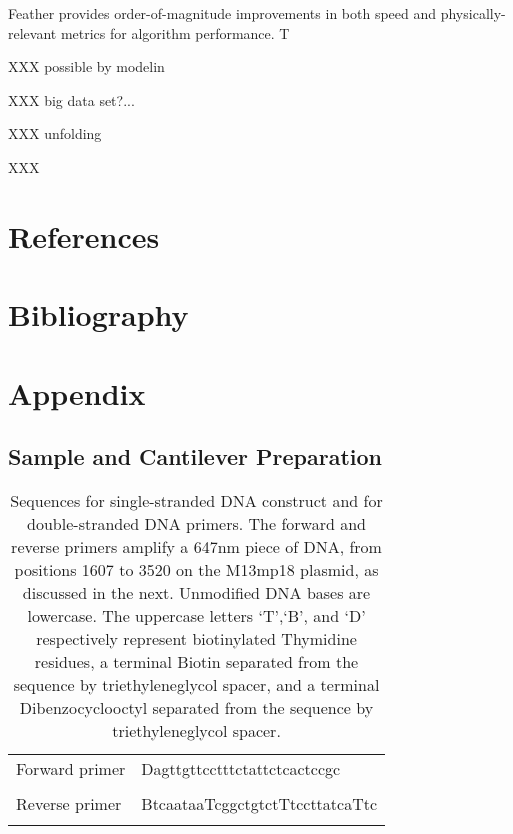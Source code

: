 \documentclass[%
  aip,12pt,tightenlines,
  amsthm,
 amsmath,amssymb
]{article}
\newcommand{\e}[0]{\\ \hline}
\newcommand{\tLabel}[1]{\label{table:#1}}
\newcommand{\sLabel}[1]{\label{section:#1}}
\newcommand{\firstp}[0]{}
\newcommand{\pl}[0]{\vspace{6pt}}
\newcommand{\name}[0]{Feather}
\begin{document}
\firstp \pl \name{} provides order-of-magnitude improvements in both speed and physically-relevant metrics for algorithm performance. T

XXX possible by modelin 

XXX big data set?...

XXX unfolding

XXX


\clearpage

\section{References}



\clearpage

\section{Bibliography}

 


\clearpage

\section{Appendix}

\renewcommand{\thepage}{S\arabic{page}} 
\renewcommand{\thesection}{S\arabic{section}}  
\renewcommand{\thetable}{S\arabic{table}}  
\renewcommand{\thefigure}{S\arabic{figure}} 
\setcounter{figure}{0}
\setcounter{table}{0}


\subsection{\sLabel{SampleDetails}Sample and Cantilever Preparation}


\begin{table}
\begin{tabularx}{\textwidth}{ l | l  }
\hline \hline
Forward primer & Dagttgttcctttctattctcactccgc \\ \e 
Reverse primer & BtcaataaTcggctgtctTtccttatcaTtc \\ \e 
\end{tabularx}
\caption[DNA primer sequences]{\tLabel{Sequences}Sequences for single-stranded DNA construct and for double-stranded DNA primers. The forward and reverse primers amplify a 647nm piece of DNA, from positions 1607 to 3520 on the M13mp18 plasmid, as discussed in the next. Unmodified DNA bases are lowercase. The uppercase letters `T',`B', and `D' respectively represent biotinylated Thymidine residues, a terminal Biotin separated from the sequence by triethyleneglycol spacer, and a terminal Dibenzocyclooctyl separated from the sequence by triethyleneglycol spacer.}
\end{table}
\end{document}
